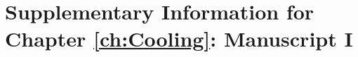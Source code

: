 \chapter{Supplementary Information for Chapter \ref{ch:Cooling}: Manuscript I}
\label{appendix: Cooling}
\acresetall
